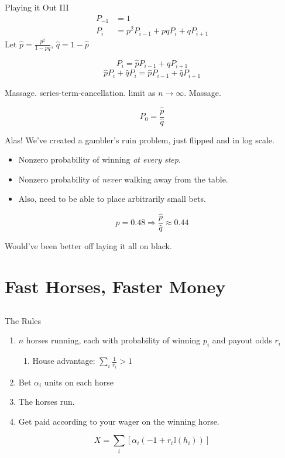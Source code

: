 \documentclass[pdf]{beamer}
\begin{document}
\begin{frame}{Playing it Out III}
\begin{align*} 
  P_{-1} &= 1\\
  P_{i} &= p^2 P_{i-1} + pqP_{i} + qP_{i+1}
\end{align*}
\pause
Let $\hat{p} = \frac{p^2}{1-pq}$, $\hat{q} = 1- \hat{p}$

\[P_i = \hat{p} P_{i-1} + \hat{q} P_{i+1}\]
\[\hat{p} P_i + \hat{q} P_i = \hat{p} P_{i-1} + \hat{q} P_{i+1}\]

  Massage. \pause series-term-cancellation. \pause limit as $n\rightarrow\infty$. \pause Massage.

\[ P_0 = \frac{\hat{p}}{\hat{q}}\]
\end{frame}


\begin{frame}{Alas!}
  We've created a gambler's ruin problem, just flipped and in log scale.

  \begin{itemize}
  \item Nonzero probability of winning \alert{\emph{at every step}}.
  \item Nonzero probability of \alert{\emph{never}} walking away from the table.
  \item Also, need to be able to place arbitrarily small bets.
  \end{itemize}

  \pause

  \[ p=0.48 \Rightarrow \frac{\hat{p}}{\hat{q}} \approx 0.44 \]

  \pause

  Would've been better off laying it all on black.
\end{frame}

\section{Fast Horses, Faster Money}
\subsection{}
\begin{frame}{The Rules}
  \begin{enumerate}
  \item $n$ horses running, each with probability of winning $p_i$ and payout odds $r_i$
    \begin{enumerate}
      \item House advantage: $\sum_i \frac{1}{r_i} > 1$
    \end{enumerate}
  \pause\item Bet $\alpha_i$ units on each horse
  \pause\item The horses run.
  \pause\item Get paid according to your wager on the winning horse.
  \end{enumerate}

  \[ X = \sum_i \left[ \alpha_i (-1 + r_i\mathbb{I}(h_i)) \right] \]
\end{frame}
\end{document}
